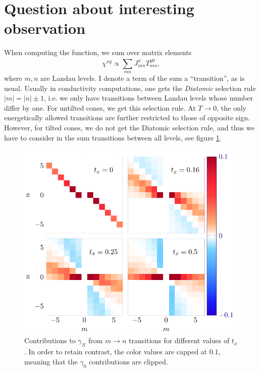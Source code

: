 \documentclass{scrarticle}
\begin{document}
\section{Question about interesting observation}

When computing the function, we sum over matrix elements
\begin{equation}
  \label{eq:1}
  \chi^{xy} \propto \sum\limits_{mn}^{} J^x_{mn} T_{mn}^{y0},
\end{equation}
where \( m,n \) are Landau levels.
I denote a term of the sum a ``transition'', as is usual.
Usually in conductivity computations, one gets the \emph{Diatomic} selection rule \( |m| = |n| \pm 1 \), i.e. we only have transitions between Landau levels whose number differ by one.
For untilted cones, we get this selection rule.
At \( T\to 0 \), the only energetically allowed transitions are further restricted to those of opposite sign.
However, for tilted cones, we do not get the Diatomic selection rule, and thus we have to consider in the sum transitions between all levels, see figure \ref{fig:contribs}.

\begin{figure}[p]
  \centering
  \includegraphics[width=\textwidth]{../Thesis/figures/external/contribmn-P}
  \caption{Contributions to \( \gamma_N \) from \( m\to n \) transitions for different values of \( t_x \).
    In order to retain contrast, the color values are capped at \( 0.1 \), meaning that the \( \gamma_0 \) contributions are clipped.
    \label{fig:contribs}
    }
\end{figure}
\end{document}
